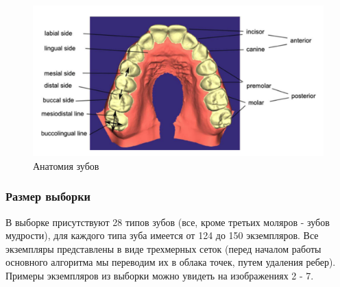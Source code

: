 \begin{figure}[h]
\includegraphics[width=1\linewidth]{images/dental_parts.png}
\caption{Анатомия зубов}
\label{fig:dental_parts}
\end{figure}


\subsubsection{Размер выборки}

В выборке присутствуют 28 типов зубов (все, кроме третьих моляров - зубов мудрости), для каждого типа зуба имеется от 124 до 150 экземпляров. Все экземпляры представлены в виде трехмерных сеток (перед началом работы основного алгоритма мы переводим их в облака точек, путем удаления ребер). Примеры экземпляров из выборки можно увидеть на  изображениях 2 - 7. %


